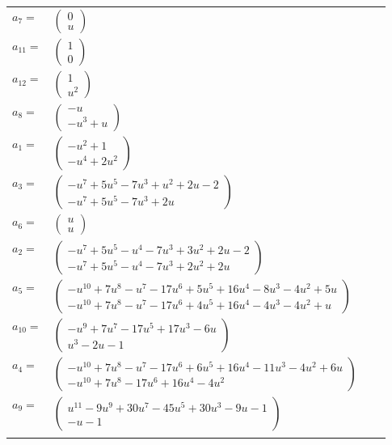 \documentclass[1p]{elsarticle_modified}
\theoremstyle{definition}
\begin{document}
\begin{tabular}{m{7pt} m{180pt} m{7pt} m{180pt} }
\flushright $a_{7}=$&$\begin{pmatrix}0\\u\end{pmatrix}$ \\
\flushright $a_{11}=$&$\begin{pmatrix}1\\0\end{pmatrix}$ \\
\flushright $a_{12}=$&$\begin{pmatrix}1\\u^2\end{pmatrix}$ \\
\flushright $a_{8}=$&$\begin{pmatrix}- u\\- u^3+u\end{pmatrix}$ \\
\flushright $a_{1}=$&$\begin{pmatrix}- u^2+1\\- u^4+2 u^2\end{pmatrix}$ \\
\flushright $a_{3}=$&$\begin{pmatrix}- u^7+5 u^5-7 u^3+u^2+2 u-2\\- u^7+5 u^5-7 u^3+2 u\end{pmatrix}$ \\
\flushright $a_{6}=$&$\begin{pmatrix}u\\u\end{pmatrix}$ \\
\flushright $a_{2}=$&$\begin{pmatrix}- u^7+5 u^5- u^4-7 u^3+3 u^2+2 u-2\\- u^7+5 u^5- u^4-7 u^3+2 u^2+2 u\end{pmatrix}$ \\
\flushright $a_{5}=$&$\begin{pmatrix}- u^{10}+7 u^8- u^7-17 u^6+5 u^5+16 u^4-8 u^3-4 u^2+5 u\\- u^{10}+7 u^8- u^7-17 u^6+4 u^5+16 u^4-4 u^3-4 u^2+u\end{pmatrix}$ \\
\flushright $a_{10}=$&$\begin{pmatrix}- u^9+7 u^7-17 u^5+17 u^3-6 u\\u^3-2 u-1\end{pmatrix}$ \\
\flushright $a_{4}=$&$\begin{pmatrix}- u^{10}+7 u^8- u^7-17 u^6+6 u^5+16 u^4-11 u^3-4 u^2+6 u\\- u^{10}+7 u^8-17 u^6+16 u^4-4 u^2\end{pmatrix}$ \\
\flushright $a_{9}=$&$\begin{pmatrix}u^{11}-9 u^9+30 u^7-45 u^5+30 u^3-9 u-1\\- u-1\end{pmatrix}$\\&\end{tabular}
\end{document}
